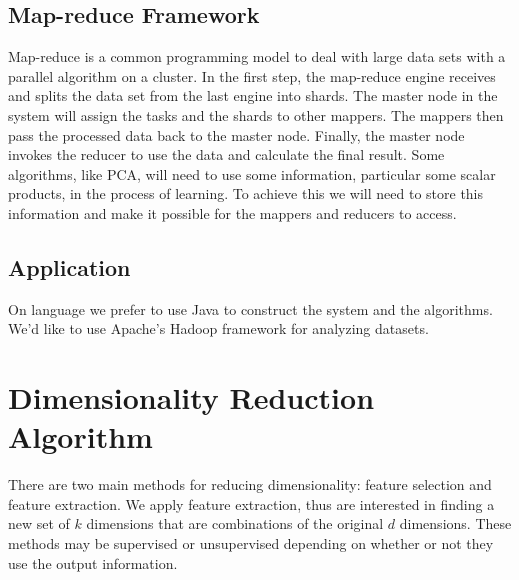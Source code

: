 \documentclass[11pt]{article}
\begin{document}
\subsection{Map-reduce Framework}
Map-reduce is a common programming model to deal with large data sets with a parallel algorithm on a cluster. In the first step, the map-reduce engine receives and splits the data set from the last engine into shards. The master node in the system will assign the tasks and the shards to other mappers. The mappers then pass the processed data back to the master node. Finally, the master node invokes the reducer to use the data and calculate the final result. Some algorithms, like PCA, will need to use some information, particular some scalar products, in the process of learning. To achieve this we will need to store this information and make it possible for the mappers and reducers to access.
\subsection{Application}
On language we prefer to use Java to construct the system and the algorithms. We'd like to use Apache's Hadoop framework for analyzing datasets.

\section{Dimensionality Reduction Algorithm}
There are two main methods for reducing dimensionality: feature selection and feature extraction. We apply feature extraction, thus are interested in finding a new set of $k$ dimensions that are combinations of the original $d$ dimensions. These methods may be supervised or unsupervised depending on whether or not they use the output information.
\end{document}
